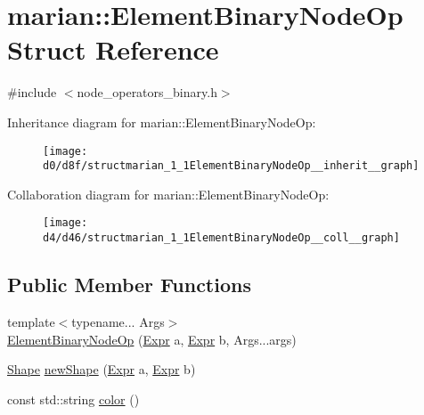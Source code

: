 \hypertarget{structmarian_1_1ElementBinaryNodeOp}{}\section{marian\+:\+:Element\+Binary\+Node\+Op Struct Reference}
\label{structmarian_1_1ElementBinaryNodeOp}


{\ttfamily \#include $<$node\+\_\+operators\+\_\+binary.\+h$>$}



Inheritance diagram for marian\+:\+:Element\+Binary\+Node\+Op\+:
\nopagebreak
\begin{figure}[H]
\begin{center}
\leavevmode
\texttt{[image: d0/d8f/structmarian\_1\_1ElementBinaryNodeOp\_\_inherit\_\_graph]}
\end{center}
\end{figure}


Collaboration diagram for marian\+:\+:Element\+Binary\+Node\+Op\+:
\nopagebreak
\begin{figure}[H]
\begin{center}
\leavevmode
\texttt{[image: d4/d46/structmarian\_1\_1ElementBinaryNodeOp\_\_coll\_\_graph]}
\end{center}
\end{figure}
\subsection*{Public Member Functions}
\begin{DoxyCompactItemize}
\item 
{\footnotesize template$<$typename... Args$>$ }\\\hyperlink{structmarian_1_1ElementBinaryNodeOp_ae36592112f9c11758c2d56b9aab0440c}{Element\+Binary\+Node\+Op} (\hyperlink{namespacemarian_a498d8baf75b754011078b890b39c8e12}{Expr} a, \hyperlink{namespacemarian_a498d8baf75b754011078b890b39c8e12}{Expr} b, Args...\+args)
\item 
\hyperlink{structmarian_1_1Shape}{Shape} \hyperlink{structmarian_1_1ElementBinaryNodeOp_ab19f15ffa616cc629569f88755c9c725}{new\+Shape} (\hyperlink{namespacemarian_a498d8baf75b754011078b890b39c8e12}{Expr} a, \hyperlink{namespacemarian_a498d8baf75b754011078b890b39c8e12}{Expr} b)
\item 
const std\+::string \hyperlink{structmarian_1_1ElementBinaryNodeOp_a89eb88dac250c1d77a701579ce1eb23e}{color} ()
\end{DoxyCompactItemize}
